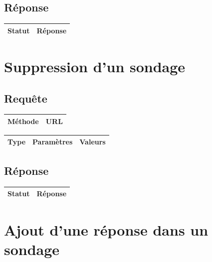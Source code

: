 \documentclass[titlepage]{report}
\begin{document}
\section{Réponse}

\begin{center}
	\begin{tabular}{|c|c|}
		\hline
		Statut & Réponse \\
		\hline
		
	\end{tabular}
\end{center}


\chapter{Suppression d'un sondage}

\section{Requête}

\begin{center}
	\begin{tabular}{|c|c|}
		\hline
		Méthode & URL \\
		\hline
		
	\end{tabular}
\end{center}


\begin{center}
	\begin{tabular}{|c|c|c|}
		\hline
		Type & Paramètres & Valeurs \\
		\hline
		
	\end{tabular}
\end{center}


\section{Réponse}

\begin{center}
	\begin{tabular}{|c|c|}
		\hline
		Statut & Réponse \\
		\hline
		
	\end{tabular}
\end{center}

\chapter{Ajout d'une réponse dans un sondage}
\end{document}
